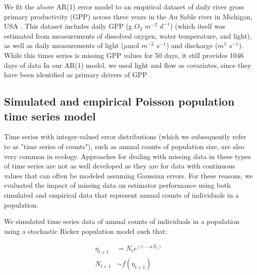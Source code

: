 \documentclass{article}
\begin{document}

We fit the above AR(1) error model to an empirical dataset of daily river gross primary productivity (GPP) across three years in the Au Sable river in Michigan, USA  \citep{hall_turbidity_2015}. This dataset includes daily GPP (g \(O_2\) \(m^{-2}\) \(d^{-1}\)) (which itself was estimated from measurements of dissolved oxygen, water temperature, and light), as  well as daily measurements of light (\(\mu\)mol \(m^{-2}\) \(s^{-1}\)) and discharge (\(m^{3}\) \(s^{-1}\)). While this times series is missing GPP values for 50 days, it still provides 1046 days of data %
In our AR(1) model, we used light and flow as covariates, since they have been identified as primary drivers of GPP \citep{bernhardt_metabolic_2018}. 

\subsection*{Simulated and empirical Poisson population time series model}

Time series with integer-valued error distributions (which we subsequently refer to as "time series of counts"), such as annual counts of population size, are also very common in ecology. Approaches for dealing with missing data in these types of time series are not as well developed as they are for data with continuous values that can often be modeled assuming Gaussian errors. For these reasons, we evaluated the impact of missing data on estimator performance using both simulated and empirical data that represent annual counts of individuals in a population. 


We simulated time series data of annual counts of individuals in a population using a stochastic Ricker population model \citep{ricker1954stock} such that:

\begin{subequations}
\begin{align} \label{eq:ricker2}
    \eta_{t+1} &= N_t e^{(r - \alpha N_t)}\\
    N_{t+1} &\sim f(\eta_{t+1})
\end{align}
\end{subequations}
\end{document}
